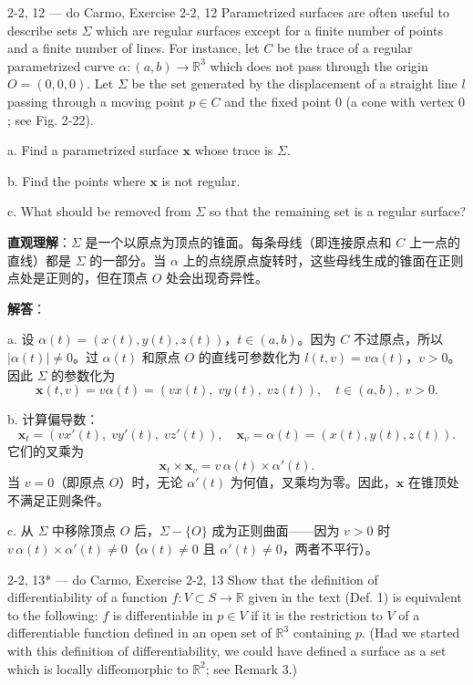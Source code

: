 \begin{exercise}{2-2, 12 — do Carmo, Exercise 2-2, 12}
Parametrized surfaces are often useful to describe sets $\Sigma$ which are regular surfaces except for a finite number of points and a finite number of lines. For instance, let $C$ be the trace of a regular parametrized curve $\alpha: (a, b) \to \mathbb{R}^3$ which does not pass through the origin $O = (0, 0, 0)$. Let $\Sigma$ be the set generated by the displacement of a straight line $l$ passing through a moving point $p \in C$ and the fixed point $0$ (a cone with vertex $0$; see Fig. 2-22).

a. Find a parametrized surface $\mathbf{x}$ whose trace is $\Sigma$.

b. Find the points where $\mathbf{x}$ is not regular.

c. What should be removed from $\Sigma$ so that the remaining set is a regular surface?
\end{exercise}

\begin{solution}
\textbf{直观理解}：$\Sigma$ 是一个以原点为顶点的锥面。每条母线（即连接原点和 $C$ 上一点的直线）都是 $\Sigma$ 的一部分。当 $\alpha$ 上的点绕原点旋转时，这些母线生成的锥面在正则点处是正则的，但在顶点 $O$ 处会出现奇异性。

\textbf{解答}：

a. 设 $\alpha(t) = (x(t), y(t), z(t))$，$t \in (a,b)$。因为 $C$ 不过原点，所以 $|\alpha(t)| \neq 0$。过 $\alpha(t)$ 和原点 $O$ 的直线可参数化为 $l(t, v) = v \alpha(t)$，$v > 0$。因此 $\Sigma$ 的参数化为
\[
\mathbf{x}(t, v) = v \alpha(t) = (v x(t),\; v y(t),\; v z(t)), \quad t \in (a,b),\; v > 0.
\]

b. 计算偏导数：
\[
\mathbf{x}_t = (v x'(t),\; v y'(t),\; v z'(t)), \quad \mathbf{x}_v = \alpha(t) = (x(t), y(t), z(t)).
\]
它们的叉乘为
\[
\mathbf{x}_t \times \mathbf{x}_v = v\,\alpha(t) \times \alpha'(t).
\]
当 $v = 0$（即原点 $O$）时，无论 $\alpha'(t)$ 为何值，叉乘均为零。因此，$\mathbf{x}$ 在锥顶处不满足正则条件。

c. 从 $\Sigma$ 中移除顶点 $O$ 后，$\Sigma - \{O\}$ 成为正则曲面——因为 $v > 0$ 时 $v\,\alpha(t) \times \alpha'(t) \neq 0$（$\alpha(t) \neq 0$ 且 $\alpha'(t) \neq 0$，两者不平行）。
\end{solution}

\begin{exercise}{2-2, 13* — do Carmo, Exercise 2-2, 13}
Show that the definition of differentiability of a function $f: V \subset S \to \mathbb{R}$ given in the text (Def. 1) is equivalent to the following: $f$ is differentiable in $p \in V$ if it is the restriction to $V$ of a differentiable function defined in an open set of $\mathbb{R}^3$ containing $p$. (Had we started with this definition of differentiability, we could have defined a surface as a set which is locally diffeomorphic to $\mathbb{R}^2$; see Remark 3.)
\end{exercise}

